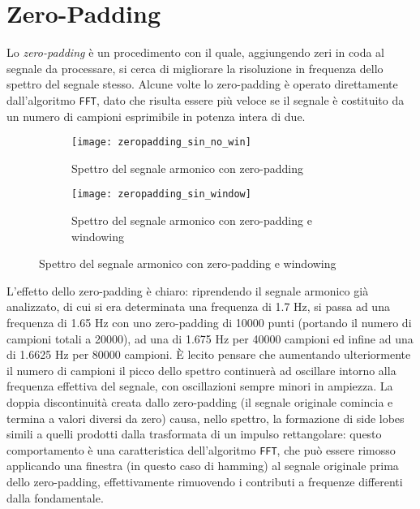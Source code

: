 \documentclass{article} %
\begin{document}
\section{Zero-Padding}
Lo \textit{zero-padding} è un procedimento con il quale, aggiungendo zeri in coda al segnale da processare, si cerca di migliorare la risoluzione in frequenza dello spettro del segnale stesso. Alcune volte lo zero-padding è operato direttamente dall'algoritmo \texttt{FFT}, dato che risulta essere più veloce se il segnale è costituito da un numero di campioni esprimibile in potenza intera di due.
\begin{figure}[h!]
	\begin{subfigure}{0.5\textwidth}
		\texttt{[image: zeropadding\_sin\_no\_win]}
		\caption{Spettro del segnale armonico con zero-padding}
	\end{subfigure}
	\begin{subfigure}{0.5\textwidth}
		\texttt{[image: zeropadding\_sin\_window]}
		\caption{Spettro del segnale armonico con zero-padding e windowing}
	\end{subfigure}
\end{figure}\par
L'effetto dello zero-padding è chiaro: riprendendo il segnale armonico già analizzato, di cui si era determinata una frequenza di 1.7 Hz, si passa ad una frequenza di 1.65 Hz con uno zero-padding di 10000 punti (portando il numero di campioni totali a 20000), ad una di 1.675 Hz per 40000 campioni ed infine ad una di 1.6625 Hz per 80000 campioni. È lecito pensare che aumentando ulteriormente il numero di campioni il picco dello spettro continuerà ad oscillare intorno alla frequenza effettiva del segnale, con oscillazioni sempre minori in ampiezza. La doppia discontinuità creata dallo zero-padding (il segnale originale comincia e termina a valori diversi da zero) causa, nello spettro, la formazione di side lobes simili a quelli prodotti dalla trasformata di un impulso rettangolare: questo comportamento è una caratteristica dell'algoritmo \texttt{FFT}, che può essere rimosso applicando una finestra (in questo caso di hamming) al segnale originale prima dello zero-padding, effettivamente rimuovendo i contributi a frequenze differenti dalla fondamentale.
\end{document}
